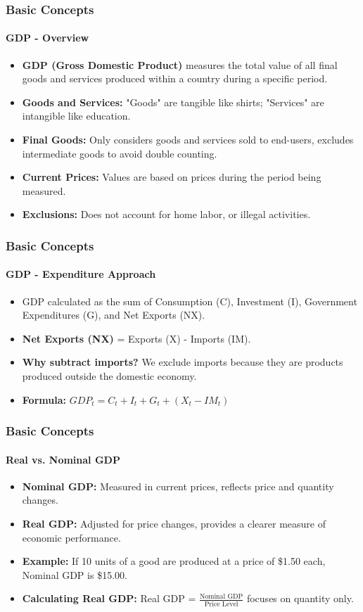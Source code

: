 \documentclass{beamer}
\begin{document}
\begin{frame}
    \frametitle{Basic Concepts}
    \framesubtitle{GDP - Overview}
        \begin{itemize}
            \item \textbf{GDP (Gross Domestic Product)} measures the total value of all final goods and services produced within a country during a specific period.
            \item \textbf{Goods and Services:} "Goods" are tangible like shirts; "Services" are intangible like education.
            \item \textbf{Final Goods:} Only considers goods and services sold to end-users, excludes intermediate goods to avoid double counting.
            \item \textbf{Current Prices:} Values are based on prices during the period being measured.
            \item \textbf{Exclusions:} Does not account for home labor,  or illegal activities.
        \end{itemize}
    \end{frame}
    
    \begin{frame}
        \frametitle{Basic Concepts}
        \framesubtitle{GDP - Expenditure Approach}
            \begin{itemize}
                \item GDP calculated as the sum of Consumption (C), Investment (I), Government Expenditures (G), and Net Exports (NX).
                \item \textbf{Net Exports (NX)} = Exports (X) - Imports (IM).
                \item \textbf{Why subtract imports?} We exclude imports because they are products produced outside the domestic economy.
                \item \textbf{Formula:} $GDP_t = C_t + I_t + G_t + (X_t - IM_t)$
            \end{itemize}
        \end{frame}
        
        \begin{frame}
            \frametitle{Basic Concepts}
            \framesubtitle{Real vs. Nominal GDP}
                \begin{itemize}
                    \item \textbf{Nominal GDP:} Measured in current prices, reflects price and quantity changes.
                    \item \textbf{Real GDP:} Adjusted for price changes, provides a clearer measure of economic performance.
                    \item \textbf{Example:} If 10 units of a good are produced at a price of \$1.50 each, Nominal GDP is \$15.00.
                    \item \textbf{Calculating Real GDP:} Real GDP = $\frac{\text{Nominal GDP}}{\text{Price Level}}$ focuses on quantity only.
                \end{itemize}
            \end{frame}
            
\end{document}
